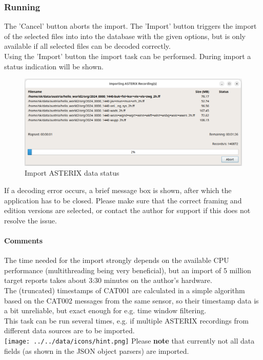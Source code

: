 \subsubsection{Running}

The 'Cancel' button aborts the import.  The 'Import' button triggers the import of the selected files into into the database with the given options, but is only available if all selected files can be decoded correctly. \\

Using the 'Import' button the import task can be performed. During import a status indication will be shown. \\

\begin{figure}[H]
  \center
    \includegraphics[width=14cm]{figures/asterix_import_data_status.png}
  \caption{Import ASTERIX data status}
\end{figure}

If a decoding error occurs, a brief message box is shown, after which the application has to be closed. 
Please make sure that the correct framing and edition versions are selected, or contact the author for support if this does not resolve the issue. \\

\paragraph{Comments}
The time needed for the import strongly depends on the available CPU performance (multithreading being very beneficial), but an import of 5 million target reports takes about 3:30 minutes on the author's hardware. \\

The (truncated) timestamps of CAT001 are calculated in a simple algorithm based on the CAT002 messages from the same sensor, so their timestamp data is a bit unreliable, but exact enough for e.g. time window filtering. \\

This task can be run several times, e.g. if multiple ASTERIX recordings from different data sources are to be imported. \\

\texttt{[image: ../../data/icons/hint.png]} Please \textbf{note} that currently not all data fields (as shown in the JSON object parsers) are imported.\\


